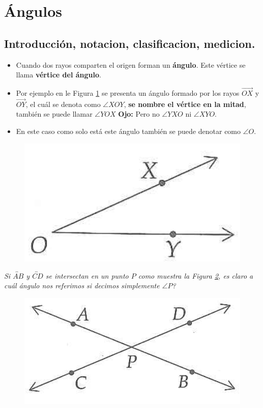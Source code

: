 \section{Ángulos}\label{subseccion_angulos_intro}

\subsection{Introducción, notacion, clasificacion, medicion.}\label{subsection_intro_notacion_clasificacion_medicion}

\begin{itemize}
	\item Cuando dos rayos comparten el origen forman un \textbf{ángulo}. Este vértice se llama \textbf{vértice del ángulo}. 
	\item Por ejemplo en le Figura \ref{Angulo_XOY} se presenta un ángulo formado por los rayos $\overrightarrow{OX}$ y $\overrightarrow{OY}$, el cuál se denota como $\angle XOY$, \textbf{se nombre el vértice en la mitad}, también se puede llamar $\angle YOX$ \textbf{Ojo:} Pero no $\angle YXO$ ni  $\angle XYO$.
	\item En este caso como solo está este ángulo también se puede denotar como $\angle O$.
\end{itemize}


\begin{figure}[H]
	\centering
	\includegraphics[width=0.3\linewidth]{Geometria/imgs/Angulo_XOY}
	\label{Angulo_XOY}
\end{figure}

\textit{Si $\overleftrightarrow{AB}$ y $\overleftrightarrow{CD}$ se intersectan en un punto $P$ como muestra la Figura \ref{dos_angulos}, es claro a cuál ángulo nos referimos si decimos simplemente $\angle P$?}


\begin{figure}[H]
	\centering
	\includegraphics[width=0.3\linewidth]{Geometria/imgs/dos_angulos}
	\label{dos_angulos}
\end{figure}

